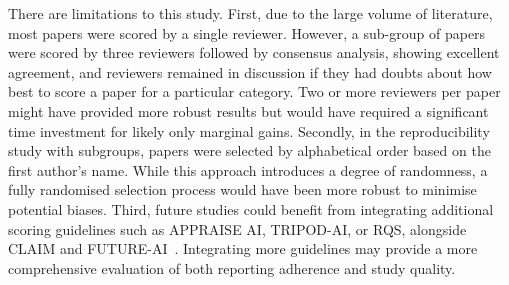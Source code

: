 There are limitations to this study.
First, due to the large volume of literature, most papers were scored by a single reviewer.
However, a sub-group of papers were scored by three reviewers followed by consensus analysis, showing excellent agreement, and reviewers remained in discussion if they had doubts about how best to score a paper for a particular category.
Two or more reviewers per paper might have provided more robust results but would have required a significant time investment for likely only marginal gains.
Secondly, in the reproducibility study with subgroups, papers were selected by alphabetical order based on the first author's name.
While this approach introduces a degree of randomness, a fully randomised selection process would have been more robust to minimise potential biases.
Third, future studies could benefit from integrating additional scoring guidelines such as APPRAISE AI, TRIPOD-AI, or RQS, alongside CLAIM and FUTURE-AI~\autocite{lambin2017,kwong2023,collins2024}.
Integrating more guidelines may provide a more comprehensive evaluation of both reporting adherence and study quality.

